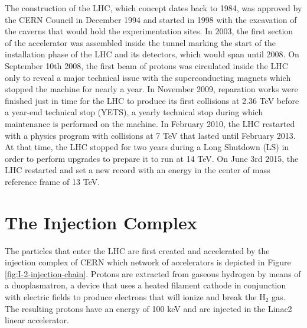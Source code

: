   The construction of the LHC, which concept dates back to 1984, was approved by the CERN Council in December 1994 and started in 1998 with the excavation of the caverns that would hold the experimentation sites. In 2003, the first section of the accelerator was assembled inside the tunnel marking the start of the installation phase of the LHC and its detectors, which would span until 2008. On September 10th 2008, the first beam of protons was circulated inside the LHC only to reveal a major technical issue with the superconducting magnets which stopped the machine for nearly a year. In November 2009, reparation works were finished just in time for the LHC to produce its first collisions at 2.36 TeV before a year-end technical stop (YETS), a yearly technical stop during which maintenance is performed on the machine. In February 2010, the LHC restarted with a physics program with collisions at 7 TeV that lasted until February 2013. At that time, the LHC stopped for two years during a Long Shutdown (LS) in order to perform upgrades to prepare it to run at 14 TeV. On June 3rd 2015, the LHC restarted and set a new record with an energy in the center of mass reference frame of 13 TeV.

  \section{The Injection Complex}

    The particles that enter the LHC are first created and accelerated by the injection complex of CERN which network of accelerators is depicted in Figure \ref{fig:I-2-injection-chain}. Protons are extracted from gaseous hydrogen by means of a duoplasmatron, a device that uses a heated filament cathode in conjunction with electric fields to produce electrons that will ionize and break the H$_2$ gas. The resulting protons have an energy of 100 keV and are injected in the Linac2 linear accelerator. \\

